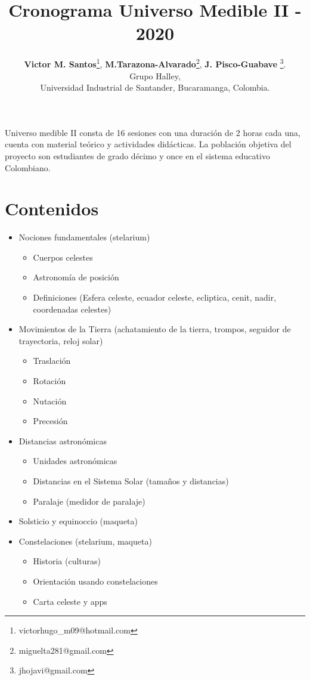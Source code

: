 \documentclass[10pt,a4paper]{article}
\title{Cronograma Universo Medible II - 2020}
\author{\textbf{Victor M. Santos}\thanks{victorhugo\_m09@hotmail.com}, \textbf{M.Tarazona-Alvarado}\thanks{miguelta281@gmail.com}, \textbf{J. Pisco-Guabave} \thanks{jhojavi@gmail.com}. \\ Grupo Halley, \\ Universidad Industrial de Santander, Bucaramanga, Colombia.}
\date{ }
\begin{document}
\maketitle

Universo medible II consta de 16 sesiones con una duración de 2 horas cada una, cuenta con material teórico y actividades didácticas. La población objetiva del proyecto son estudiantes de grado décimo y once en el sistema educativo Colombiano. 

\tableofcontents

\section{Contenidos}
\begin{itemize}
\item Nociones fundamentales (stelarium)
 \begin{itemize}
  \item Cuerpos celestes 
  \item Astronomía de posición 
  \item Definiciones (Esfera celeste, ecuador celeste, ecliptica, cenit, nadir, coordenadas celestes)
 \end{itemize}
\item Movimientos de la Tierra (achatamiento de la tierra, trompos, seguidor de trayectoria, reloj solar)
 \begin{itemize}
  \item Traslación 
  \item Rotación
  \item Nutación
  \item Precesión 
 \end{itemize}
\item Distancias astronómicas 
 \begin{itemize}
 \item Unidades astronómicas
 \item Distancias en el Sistema Solar (tamaños y distancias)
 \item Paralaje (medidor de paralaje)
 \end{itemize} 
\item Solsticio y equinoccio (maqueta)
\item Constelaciones (stelarium, maqueta)
 \begin{itemize}
  \item Historia (culturas)
  \item Orientación usando constelaciones 
  \item Carta celeste y apps

\end{itemize}
\end{itemize}
\end{document}

